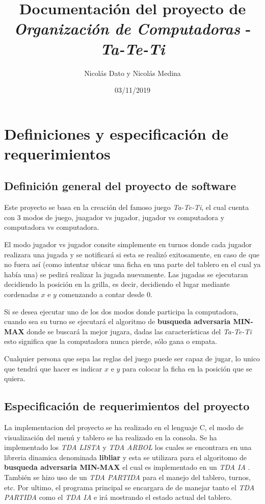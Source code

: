 \documentclass[12pt,a4paper]{article}
\title{Documentaci\'on del proyecto de \emph{Organizaci\'on de Computadoras} - \emph{Ta-Te-Ti}}
\author{Nicol\'as Dato y Nicol\'as Medina}
\date{03/11/2019}
\begin{document}
\maketitle

\newpage
\tableofcontents
\newpage

\section{Definiciones y especificaci\'on de requerimientos}

\subsection{Definici\'on general del proyecto de software}
	Este proyecto se basa en la creaci\'on del famoso juego \emph{Ta-Te-Ti}, el cual cuenta con 3 modos de juego, juagador vs jugador, jugador vs computadora y computadora vs computadora.

	El modo jugador vs jugador consite simplemente en turnos donde cada jugador realizara una jugada y se notificar\'a si esta se realiz\'o exitosamente, en caso de que no fuera as\'i (como intentar ubicar una ficha en una parte del tablero en el cual ya hab\'ia una) se pedir\'a realizar la jugada nuevamente. Las jugadas se ejecutaran decidiendo la posici\'on en la grilla, es decir, decidiendo el lugar mediante cordenadas $x$ e $y$ comenzando a contar desde $0$.

	Si se desea ejecutar uno de los dos modos donde participa la computadora, cuando sea su turno se ejecutar\'a el algoritmo de {\bf busqueda adversaria MIN-MAX} donde se buscar\'a la mejor jugara, dadas las caracter\'isticas del \emph{Ta-Te-Ti} esto significa que la computadora nunca pierde, s\'olo gana o empata.

    Cualquier persona que sepa las reglas del juego puede ser capaz de jugar, lo unico que tendr\'a que hacer es indicar $x$ e $y$ para colocar la ficha en la posici\'on que se quiera.

\subsection{Especificaci\'on de requerimientos del proyecto}
    La implementacion del proyecto se ha realizado en el lenguaje C, el modo de visualizaci\'on del men\'u y tablero se ha realizado en la consola. Se ha implementado los {\itshape TDA LISTA} y {\itshape TDA ARBOL} los cuales se encontrara en una libreria dinamica denominada {\bf libliar} y esta se utilizara para el algoritomo de {\bf busqueda adversaria MIN-MAX} el cual es implementado en un {\itshape TDA IA} . Tambi\'en se hizo uso de un {\itshape TDA PARTIDA} para el manejo del tablero, turnos, etc. Por ultimo, el programa principal se encargara de de manejar tanto el {\itshape TDA PARTIDA} como el {\itshape TDA IA} e ir\'a mostrando el estado actual del tablero.
\end{document}

